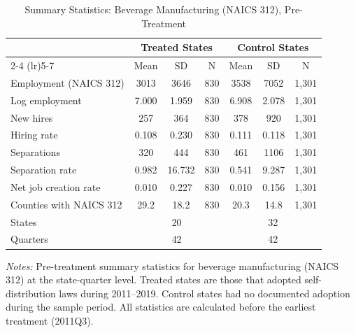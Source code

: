\begin{table}[t]
\centering
\caption{Summary Statistics: Beverage Manufacturing (NAICS 312), Pre-Treatment}
\label{tab:sumstats}
\begin{threeparttable}
\begin{tabular}{lcccccc}
\toprule
 & \multicolumn{3}{c}{Treated States} & \multicolumn{3}{c}{Control States} \\
\cmidrule(lr){2-4} \cmidrule(lr){5-7}
 & Mean & SD & N & Mean & SD & N \\
\midrule
Employment (NAICS 312) & 3013 & 3646 & 830 & 3538 & 7052 & 1,301 \\
Log employment & 7.000 & 1.959 & 830 & 6.908 & 2.078 & 1,301 \\
New hires & 257 & 364 & 830 & 378 & 920 & 1,301 \\
Hiring rate & 0.108 & 0.230 & 830 & 0.111 & 0.118 & 1,301 \\
Separations & 320 & 444 & 830 & 461 & 1106 & 1,301 \\
Separation rate & 0.982 & 16.732 & 830 & 0.541 & 9.287 & 1,301 \\
Net job creation rate & 0.010 & 0.227 & 830 & 0.010 & 0.156 & 1,301 \\
Counties with NAICS 312 & 29.2 & 18.2 & 830 & 20.3 & 14.8 & 1,301 \\
\midrule
States & \multicolumn{3}{c}{20} & \multicolumn{3}{c}{32} \\
Quarters & \multicolumn{3}{c}{42} & \multicolumn{3}{c}{42} \\
\bottomrule
\end{tabular}
\begin{tablenotes}[flushleft]\small
\item \textit{Notes:} Pre-treatment summary statistics for beverage manufacturing
(NAICS 312) at the state-quarter level. Treated states are those that adopted
self-distribution laws during 2011--2019. Control states had no documented adoption
during the sample period. All statistics are calculated before the earliest
treatment (2011Q3).
\end{tablenotes}
\end{threeparttable}
\end{table}
